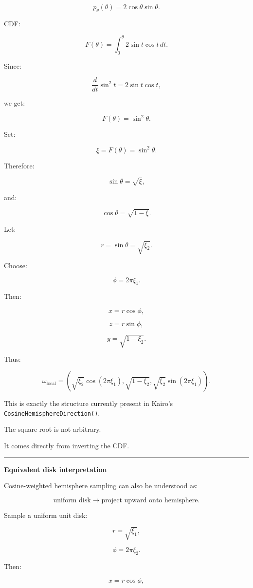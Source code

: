 \[
p_\theta(\theta)
=
2\cos\theta\sin\theta.
\]

CDF:

\[
F(\theta)
=
\int_0^\theta
2\sin t\cos t\,dt.
\]

Since:

\[
\frac{d}{dt}\sin^2t
=
2\sin t\cos t,
\]

we get:

\[
\boxed{
F(\theta)
=
\sin^2\theta.
}
\]

Set:

\[
\xi=F(\theta)
=
\sin^2\theta.
\]

Therefore:

\[
\sin\theta
=
\sqrt{\xi},
\]

and:

\[
\cos\theta
=
\sqrt{1-\xi}.
\]

Let:

\[
r=\sin\theta=\sqrt{\xi_2}.
\]

Choose:

\[
\phi=2\pi\xi_1.
\]

Then:

\[
x=r\cos\phi,
\]

\[
z=r\sin\phi,
\]

\[
y=\sqrt{1-\xi_2}.
\]

Thus:

\[
\boxed{
\omega_{\text{local}}
=
\left(
\sqrt{\xi_2}\cos(2\pi\xi_1),
\sqrt{1-\xi_2},
\sqrt{\xi_2}\sin(2\pi\xi_1)
\right).
}
\]

This is exactly the structure currently present in Kairo's \texttt{CosineHemisphereDirection()}.

The square root is not arbitrary.

It comes directly from inverting the CDF.

\begin{center}\rule{0.5\linewidth}{0.5pt}\end{center}

\textbf{Equivalent disk interpretation}

Cosine-weighted hemisphere sampling can also be understood as:

\[
\text{uniform disk}
\rightarrow
\text{project upward onto hemisphere}.
\]

Sample a uniform unit disk:

\[
r=\sqrt{\xi_1},
\]

\[
\phi=2\pi\xi_2.
\]

Then:

\[
x=r\cos\phi,
\]

